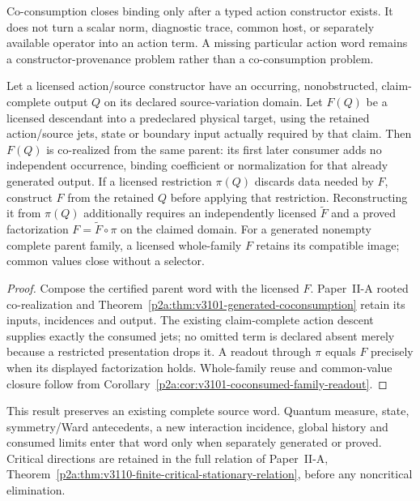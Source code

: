 \documentclass[12pt,a4paper]{article}
\begin{document}
\begin{remark}
\label{p3a:rem:v183-action-coconsumption-firewall}
Co-consumption closes binding only after a typed action constructor exists.  It
does not turn a scalar norm, diagnostic trace, common host, or separately
available operator into an action term.  A missing particular action word
remains a constructor-provenance problem rather than a co-consumption problem.
\end{remark}
\begin{corollary}
\label{p3a:cor:complete-parent-descendant-reuse}
Let a licensed action/source constructor have an occurring, nonobstructed,
claim-complete output \(Q\) on its declared source-variation domain.
Let \(F(Q)\) be a licensed descendant into a predeclared physical target,
using the retained action/source jets, state or boundary input actually
required by that claim.  Then \(F(Q)\) is co-realized from the same parent:
its first later consumer adds no independent occurrence, binding coefficient
or normalization for that already generated output.
If a licensed restriction \(\pi(Q)\) discards data needed by \(F\), construct
\(F\) from the retained \(Q\) before applying that restriction.  Reconstructing
it from \(\pi(Q)\) additionally requires an independently licensed
\(\widetilde F\) and a proved factorization
\(F=\widetilde F\circ\pi\) on the claimed domain.
For a generated nonempty complete parent family, a licensed whole-family
\(F\) retains its compatible image; common values close without a selector.
\end{corollary}
\begin{proof}
Compose the certified parent word with the licensed \(F\).
Paper~II-A rooted co-realization and
Theorem~\ref{p2a:thm:v3101-generated-coconsumption} retain its inputs,
incidences and output.  The existing claim-complete action descent supplies
exactly the consumed jets; no omitted term is declared absent merely because
a restricted presentation drops it.  A readout through \(\pi\) equals \(F\)
precisely when its displayed factorization holds.  Whole-family reuse and
common-value closure follow from
Corollary~\ref{p2a:cor:v3101-coconsumed-family-readout}.
\end{proof}
This result preserves an existing complete source word.  Quantum measure,
state, symmetry/Ward antecedents, a new interaction incidence, global history
and consumed limits enter that word only when separately generated or proved.
Critical directions are retained in the full relation of Paper~II-A,
Theorem~\ref{p2a:thm:v3110-finite-critical-stationary-relation}, before any
noncritical elimination.
\end{document}
